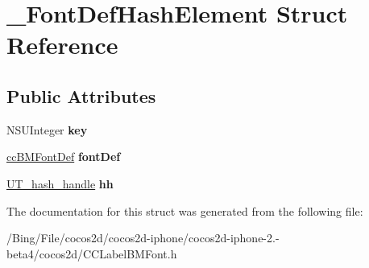 \hypertarget{struct___font_def_hash_element}{\section{\-\_\-\-Font\-Def\-Hash\-Element Struct Reference}
\label{struct___font_def_hash_element}
}
\subsection*{Public Attributes}
\begin{DoxyCompactItemize}
\item 
\hypertarget{struct___font_def_hash_element_adaaf0584f3b8ca73f9afa4df9449a149}{N\-S\-U\-Integer {\bfseries key}}\label{struct___font_def_hash_element_adaaf0584f3b8ca73f9afa4df9449a149}

\item 
\hypertarget{struct___font_def_hash_element_a4887695b981bfbcee58df5a57e7b72c8}{\hyperlink{structcc_b_m_font_def}{cc\-B\-M\-Font\-Def} {\bfseries font\-Def}}\label{struct___font_def_hash_element_a4887695b981bfbcee58df5a57e7b72c8}

\item 
\hypertarget{struct___font_def_hash_element_a0d67721facc6a1d012f086f994d76eed}{\hyperlink{struct_u_t__hash__handle}{U\-T\-\_\-hash\-\_\-handle} {\bfseries hh}}\label{struct___font_def_hash_element_a0d67721facc6a1d012f086f994d76eed}

\end{DoxyCompactItemize}


The documentation for this struct was generated from the following file\-:\begin{DoxyCompactItemize}
\item 
/\-Bing/\-File/cocos2d/cocos2d-\/iphone/cocos2d-\/iphone-\/2.-\/beta4/cocos2d/C\-C\-Label\-B\-M\-Font.\-h\end{DoxyCompactItemize}
